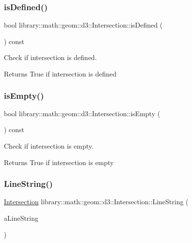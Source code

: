 \subsubsection{\texorpdfstring{is\+Defined()}{isDefined()}}
{\footnotesize\ttfamily bool library\+::math\+::geom\+::d3\+::\+Intersection\+::is\+Defined (\begin{DoxyParamCaption}{ }\end{DoxyParamCaption}) const}



Check if intersection is defined. 

\begin{DoxyReturn}{Returns}
True if intersection is defined 
\end{DoxyReturn}
\mbox{\label{classlibrary_1_1math_1_1geom_1_1d3_1_1_intersection_aad021013a517375d56e2110792ad7b07}} 
\subsubsection{\texorpdfstring{is\+Empty()}{isEmpty()}}
{\footnotesize\ttfamily bool library\+::math\+::geom\+::d3\+::\+Intersection\+::is\+Empty (\begin{DoxyParamCaption}{ }\end{DoxyParamCaption}) const}



Check if intersection is empty. 

\begin{DoxyReturn}{Returns}
True if intersection is empty 
\end{DoxyReturn}
\mbox{\label{classlibrary_1_1math_1_1geom_1_1d3_1_1_intersection_aa546d0185512a4c093a705a4c96f8960}} 
\subsubsection{\texorpdfstring{Line\+String()}{LineString()}}
{\footnotesize\ttfamily \hyperlink{classlibrary_1_1math_1_1geom_1_1d3_1_1_intersection}{Intersection} library\+::math\+::geom\+::d3\+::\+Intersection\+::\+Line\+String (\begin{DoxyParamCaption}\item[{const \hyperlink{classlibrary_1_1math_1_1geom_1_1d3_1_1objects_1_1_line_string}{objects\+::\+Line\+String} \&}]{a\+Line\+String }\end{DoxyParamCaption})\hspace{0.3cm}{\ttfamily [static]}}



